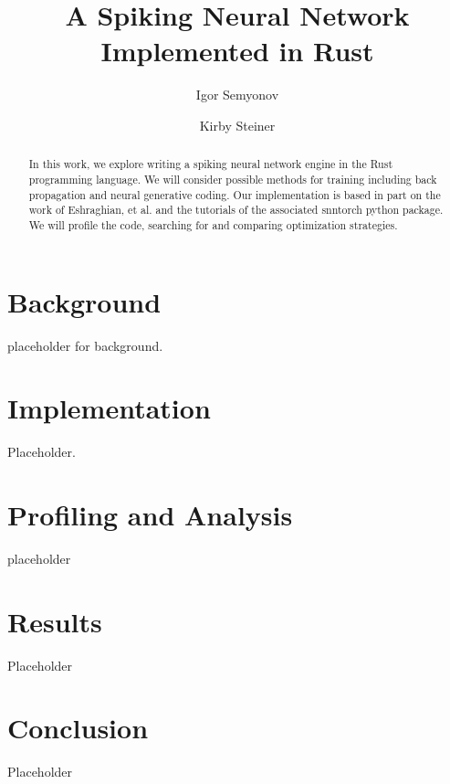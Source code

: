 \documentclass[12pt,english]{article}
\title{
    A Spiking Neural Network Implemented in Rust
}
\author{Igor Semyonov}
\author{Kirby Steiner}
\affil{George Mason University}
\begin{document}

\null  %
\nointerlineskip  %
\vfill
\let\snewpage \newpage
\let\newpage \relax
\maketitle
\thispagestyle{fancy}
\let \newpage \snewpage
\vfill
\break %

\fancyfoot{}
\fancyfoot[C]{
    \thepage \\
    \vspace{1ex}
    \class
}

\begin{abstract}
    In this work, we explore writing a spiking neural network engine in the Rust programming language.
    We will consider possible methods for training including back propagation and neural generative coding.
    Our implementation is based in part on the work of Eshraghian, et al. \cite{snntorch} and the tutorials of the associated snntorch python package.
    We will profile the code, searching for and comparing optimization strategies.
\end{abstract}

\section{Background}

placeholder for background.

\section{Implementation}

Placeholder.

\section{Profiling and Analysis}

placeholder

\section{Results}

Placeholder

\section{Conclusion}

Placeholder




\end{document}

